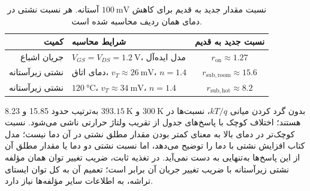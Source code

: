 \begin{table}[!htbp]
\centering
\small
\caption{نسبت مقدار جدید به قدیم برای کاهش \(\qty{100}{\milli\volt}\) آستانه. هر نسبت نشتی در دمای همان ردیف محاسبه شده است.}
\label{tab:threshold-comparison}
\begin{tabularx}{\textwidth}{@{}r X c@{}}
\toprule
کمیت & شرایط محاسبه & نسبت جدید به قدیم \\
\midrule
جریان اشباع & \(V_{GS}=V_{DS}=\qty{1.2}{\volt}\)، مدل ایده‌آل & \(r_{\mathrm{on}}\approx1.27\) \\
نشتی زیرآستانه & دمای اتاق، \(v_T\approx\qty{26}{\milli\volt}\)، \(n=1.4\) & \(r_{\mathrm{sub,room}}\approx15.6\) \\
نشتی زیرآستانه & \(\qty{120}{\degreeCelsius}\)، \(v_T\approx\qty{34}{\milli\volt}\)، \(n=1.4\) & \(r_{\mathrm{sub,hot}}\approx8.2\) \\
\bottomrule
\end{tabularx}
\end{table}

بدون گرد کردن میانی \(kT/q\)، نسبت‌ها در \(\qty{300}{\kelvin}\) و \(\qty{393.15}{\kelvin}\)
به‌ترتیب حدود \num{15.85} و \num{8.23} هستند؛ اختلاف کوچک با پاسخ‌های جدول از تقریب ولتاژ حرارتی ناشی می‌شود.
نسبت کوچک‌تر در دمای بالا به معنای کمتر بودن مقدار مطلق نشتی در آن دما نیست؛
مدل کتاب افزایش نشتی با دما را توضیح می‌دهد، اما نسبت نشتی دو دما یا مقدار مطلق آن از این پاسخ‌ها به‌تنهایی به دست نمی‌آید.
در تغذیه ثابت، ضریب تغییر توان همان مؤلفه نشتی زیرآستانه با ضریب تغییر جریان آن برابر است؛
تعمیم آن به کل توان ایستای تراشه، به اطلاعات سایر مؤلفه‌ها نیاز دارد.
